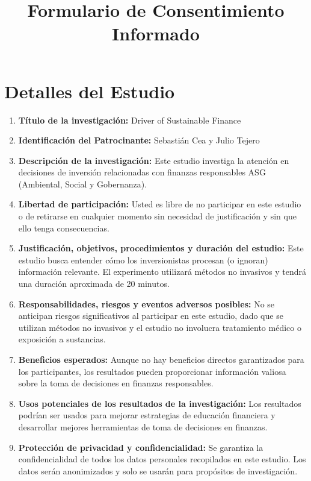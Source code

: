 \documentclass{article}
\title{Formulario de Consentimiento Informado}
\author{} %
\date{} %
\begin{document}
\maketitle
\thispagestyle{fancy} %

\section*{Detalles del Estudio}

\begin{enumerate}[label=\textbf{\arabic*.}]
    \item \textbf{Título de la investigación:} Driver of Sustainable Finance
    \item \textbf{Identificación del Patrocinante:} Sebastián Cea y  Julio Tejero
    \item \textbf{Descripción de la investigación:} Este estudio investiga la atención en decisiones de inversión relacionadas con finanzas responsables ASG (Ambiental, Social y Gobernanza).
    \item \textbf{Libertad de participación:} Usted es libre de no participar en este estudio o de retirarse en cualquier momento sin necesidad de justificación y sin que ello tenga consecuencias.
    \item \textbf{Justificación, objetivos, procedimientos y duración del estudio:} Este estudio busca entender cómo los inversionistas procesan (o ignoran) información relevante. El experimento utilizará métodos no invasivos y tendrá una duración aproximada de 20 minutos.
    \item \textbf{Responsabilidades, riesgos y eventos adversos posibles:} No se anticipan riesgos significativos al participar en este estudio, dado que se utilizan métodos no invasivos y el estudio no involucra tratamiento médico o exposición a sustancias.
    \item \textbf{Beneficios esperados:} Aunque no hay beneficios directos garantizados para los participantes, los resultados pueden proporcionar información valiosa sobre la toma de decisiones en finanzas responsables.
    \item \textbf{Usos potenciales de los resultados de la investigación:} Los resultados podrían ser usados para mejorar estrategias de educación financiera y desarrollar mejores herramientas de toma de decisiones en finanzas.
    \item \textbf{Protección de privacidad y confidencialidad:} Se garantiza la confidencialidad de todos los datos personales recopilados en este estudio. Los datos serán anonimizados y solo se usarán para propósitos de investigación.
\end{enumerate}
\end{document}
